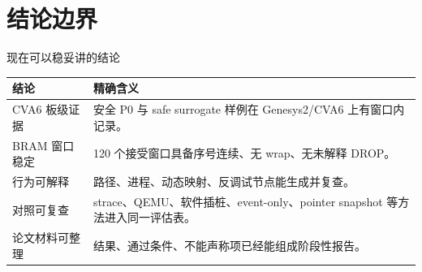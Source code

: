 \documentclass[aspectratio=169,10pt]{beamer}
\makeatletter
\newcommand{\metric}[2]{\begin{tabular}{@{}l@{}}{\Large\bfseries\color{accentcolor}#1}\\[-2pt]{\scriptsize #2}\end{tabular}}
\makeatother
\begin{document}

\section{结论边界}

\begin{frame}{现在可以稳妥讲的结论}
  \vskip0.05cm
  \begin{center}\scriptsize
  \renewcommand{\arraystretch}{1.18}
  \begin{tabularx}{0.96\linewidth}{@{}L{3.4cm}Y@{}}
    \toprule
    \textbf{结论} & \textbf{精确含义} \\
    \midrule
    CVA6 板级证据 & 安全 P0 与 safe surrogate 样例在 Genesys2/CVA6 上有窗口内记录。 \\
    BRAM 窗口稳定 & 120 个接受窗口具备序号连续、无 wrap、无未解释 DROP。 \\
    行为可解释 & 路径、进程、动态映射、反调试节点能生成并复查。 \\
    对照可复查 & strace、QEMU、软件插桩、event-only、pointer snapshot 等方法进入同一评估表。 \\
    论文材料可整理 & 结果、通过条件、不能声称项已经能组成阶段性报告。 \\
    \bottomrule
  \end{tabularx}
  \end{center}
\end{frame}
\end{document}
